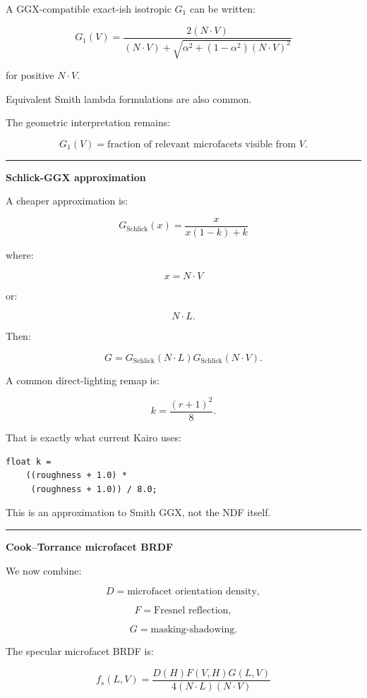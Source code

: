 A GGX-compatible exact-ish isotropic \(G_1\) can be written:

\[
\boxed{
G_1(V)
=
\frac{
2(N\cdot V)
}{
(N\cdot V)
+
\sqrt{
\alpha^2+
(1-\alpha^2)(N\cdot V)^2
}
}
}
\]

for positive \(N\cdot V\).

Equivalent Smith lambda formulations are also common.

The geometric interpretation remains:

\[
G_1(V)
=
\text{fraction of relevant microfacets visible from }V.
\]

\begin{center}\rule{0.5\linewidth}{0.5pt}\end{center}

\textbf{Schlick-GGX approximation}

A cheaper approximation is:

\[
\boxed{
G_{\text{Schlick}}(x)
=
\frac{x}
{x(1-k)+k}
}
\]

where:

\[
x=N\cdot V
\]

or:

\[
N\cdot L.
\]

Then:

\[
G=
G_{\text{Schlick}}(N\cdot L)
G_{\text{Schlick}}(N\cdot V).
\]

A common direct-lighting remap is:

\[
\boxed{
k=\frac{(r+1)^2}{8}.
}
\]

That is exactly what current Kairo uses:

\begin{verbatim}
float k =
    ((roughness + 1.0) *
     (roughness + 1.0)) / 8.0;
\end{verbatim}

This is an approximation to Smith GGX, not the NDF itself.

\begin{center}\rule{0.5\linewidth}{0.5pt}\end{center}

\textbf{Cook--Torrance microfacet BRDF}

We now combine:

\[
D=\text{microfacet orientation density},
\]

\[
F=\text{Fresnel reflection},
\]

\[
G=\text{masking-shadowing}.
\]

The specular microfacet BRDF is:

\[
\boxed{
f_s(L,V)
=
\frac{
D(H)F(V,H)G(L,V)
}{
4(N\cdot L)(N\cdot V)
}
}
\]

